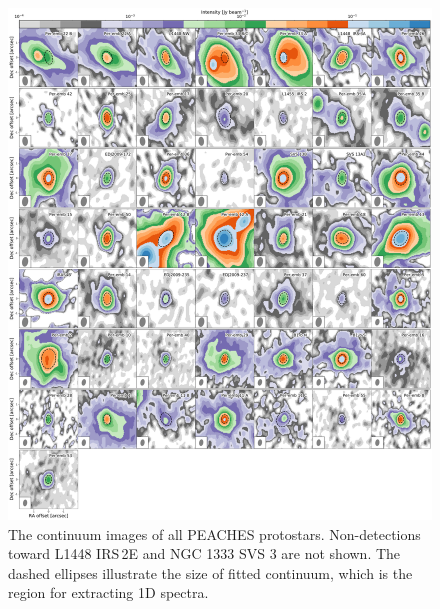 \documentclass[twocolumn]{aastex62}
\begin{document}
\begin{figure}[htbp!]
  \centering
  \includegraphics[width=\textwidth]{all_continuum.pdf}
  \caption{The continuum images of all PEACHES protostars.  Non-detections toward L1448 IRS\,2E and NGC 1333 SVS 3 are not shown.  The dashed ellipses illustrate the size of fitted continuum, which is the region for extracting 1D spectra.}
  \label{fig:continuum}
\end{figure}
\end{document}
